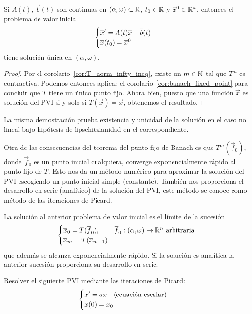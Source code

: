 \documentclass[../ecuaciones_diferenciales.tex]{subfiles}
\begin{document}
\begin{theorem}[Picard]
	Si \(A(t)\), \(\vec{b}(t)\) son continuas en
	\((\alpha, \omega) \subset \mathbb{R}\), \(t_0 \in \mathbb{R}\) y \(\overline{x}^0 \in \mathbb{R}^n\),
	entonces el problema de valor inicial
	\[\begin{cases}
		\overline{x}' = A(t)\overline{x} + \overline{b}(t) \\
		\overline{x}(t_0) = \overline{x}^0\end{cases}\]
	tiene solución única en \((\alpha, \omega)\).
\end{theorem}

\begin{proof}
	Por el corolario~\ref{cor:T_norm_infty_ineq}, existe un \(m \in \mathbb{N}\) tal que
    \(T^m\) es contractiva. Podemos entonces aplicar el
    corolario~\ref{cor:banach_fixed_point} para concluir que \(T\) tiene un
    único punto fijo. Ahora bien, puesto que una función \(\vec{x}\) es solución
    del PVI si y solo si \(T(\vec{x}) = \vec{x}\), obtenemos el resultado.
\end{proof}

\begin{remark}
	La misma demostración prueba existencia y unicidad de la solución en el caso
    no lineal bajo hipótesis de lipschitzianidad en el  correspondiente.
\end{remark}

Otra de las consecuencias del teorema del punto fijo de Banach es que
\(T^m(\vec{f}_0)\), donde \(\vec{f}_0\) es un punto inicial cualquiera, converge
exponencialmente rápido al punto fijo de \(T\). Esto nos da un método numérico
para aproximar la solución del PVI escogiendo un punto inicial simple
(constante). También nos proporciona el desarrollo en serie (analítico) de la
solución del PVI, este método se conoce como método de las iteraciones de
Picard.

\begin{corollary}
	La solución al anterior problema de valor inicial es el límite de la
	sucesión
	\[\begin{cases}
		\overline{x}_0 = T(\overline{f}_0), & \overline{f}_0 : (\alpha, \omega) \to \mathbb{R}^n \text{ arbitraria}\\
		\overline{x}_m = T(\overline{x}_{m - 1})\end{cases}\]
  que además se alcanza exponencialmente rápido. Si la solución es analítica la
  anterior sucesión proporciona su desarrollo en serie.
\end{corollary}

\begin{example}
	Resolver el siguiente PVI mediante las iteraciones de Picard:
	\[\begin{cases}x' = ax \quad \text{(ecuación escalar)} \\
			x(0) = x_0\end{cases}\]
\end{example}
\end{document}
